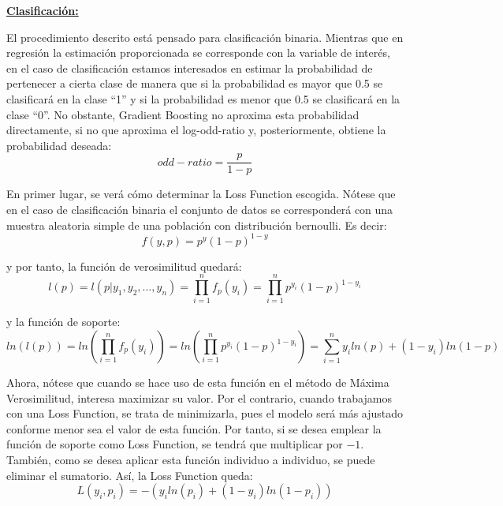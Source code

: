 \documentclass[12pt,twoside]{article}
\begin{document}
\bigskip \bigskip

\textbf{\underline{Clasificación: }}

El procedimiento descrito está pensado para clasificación binaria. Mientras que en regresión la estimación proporcionada se corresponde con la variable de interés, en el caso de clasificación estamos interesados en estimar la probabilidad de pertenecer a cierta clase de manera que si la probabilidad es mayor que 0.5 se clasificará en la clase ``1'' y si la probabilidad es menor que 0.5 se clasificará en la clase ``0''. No obstante, Gradient Boosting no aproxima esta probabilidad directamente, si no que aproxima el log-odd-ratio y, posteriormente, obtiene la probabilidad deseada:
\begin{equation*}
odd-ratio = \frac{p}{1-p}
\end{equation*}

En primer lugar, se verá cómo determinar la Loss Function escogida. Nótese que en el caso de clasificación binaria el conjunto de datos se corresponderá con una muestra aleatoria simple de una población con distribución bernoulli. Es decir:
\begin{equation*}
f(y, p) = p^y(1-p)^{1-y}
\end{equation*}

\noindent
y por tanto, la función de verosimilitud quedará:
\begin{equation*}
l(p) = l(p|y_1, y_2, \dots, y_n) = \prod_{i=1}^n f_p(y_i) = \prod_{i=1}^n p^{y_i}(1-p)^{1-y_i}
\end{equation*}

\noindent
y la función de soporte:
\begin{equation*}
ln(l(p)) = ln \left( \prod_{i=1}^n f_p(y_i) \right) = ln \left( \prod_{i=1}^n p^{y_i}(1-p)^{1-y_i} \right) = \sum_{i=1}^n y_i ln(p) + (1-y_i)ln(1-p)
\end{equation*}

Ahora, nótese que cuando se hace uso de esta función en el método de Máxima Verosimilitud, interesa maximizar su valor. Por el contrario, cuando trabajamos con una Loss Function, se trata de minimizarla, pues el modelo será más ajustado conforme menor sea el valor de esta función. Por tanto, si se desea emplear la función de soporte como Loss Function, se tendrá que multiplicar por $-1$. También, como se desea aplicar esta función individuo a individuo, se puede eliminar el sumatorio. Así, la Loss Function queda:
\begin{equation*}
L(y_i, p_i) = -( y_i ln(p_i) + (1-y_i)ln(1-p_i))
\end{equation*}
\end{document}
